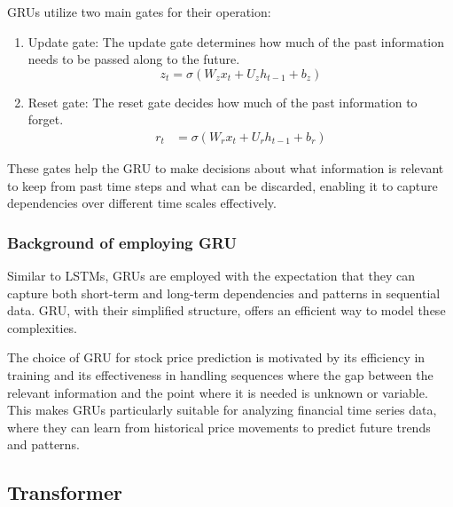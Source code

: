 GRUs utilize two main gates for their operation:
\begin{enumerate}
	\item Update gate: 	The update gate determines how much of the past information needs to be passed along to the future.
	\begin{equation}
		z_{t} = \sigma(W_{z}x_{t} + U_{z}h_{t-1} + b_{z})
	\end{equation}
	\item Reset gate:	The reset gate decides how much of the past information to forget.
	\begin{align}
		r_{t} &= \sigma(W_{r}x_{t} + U_{r}h_{t-1} + b_{r})
	\end{align}
\end{enumerate}
These gates help the GRU to make decisions about what information is relevant to keep from past time steps and what can be discarded, 
enabling it to capture dependencies over different time scales effectively.


\subsubsection{Background of employing GRU}

Similar to LSTMs, GRUs are employed with the expectation that they can capture both short-term and long-term dependencies and patterns in sequential data. 
GRU, with their simplified structure, offers an efficient way to model these complexities.

The choice of GRU for stock price prediction is motivated by its efficiency in training and its effectiveness in handling sequences where the gap between the relevant information and the point where it is needed is unknown or variable. 
This makes GRUs particularly suitable for analyzing financial time series data, where they can learn from historical price movements to predict future trends and patterns.


\subsection{Transformer}

